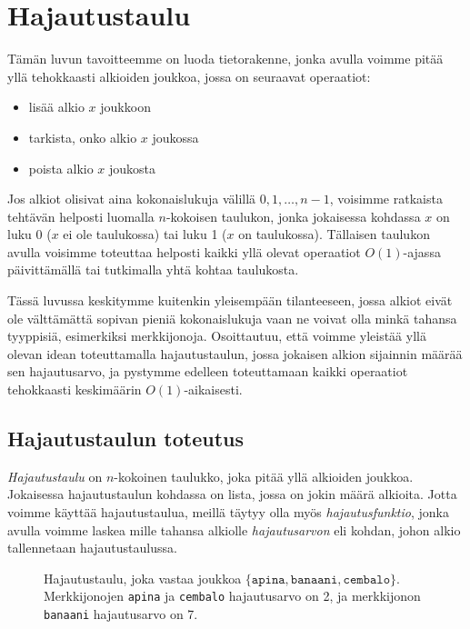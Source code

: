\chapter{Hajautustaulu}

Tämän luvun tavoitteemme on luoda tietorakenne,
jonka avulla voimme pitää yllä tehokkaasti alkioiden joukkoa,
jossa on seuraavat operaatiot:

\begin{itemize}
\item lisää alkio $x$ joukkoon
\item tarkista, onko alkio $x$ joukossa
\item poista alkio $x$ joukosta
\end{itemize}

Jos alkiot olisivat aina kokonaislukuja
välillä $0,1,\ldots,n-1$, voisimme ratkaista tehtävän
helposti luomalla $n$-kokoisen taulukon, jonka
jokaisessa kohdassa $x$ on luku 0 ($x$ ei ole taulukossa)
tai luku 1 ($x$ on taulukossa).
Tällaisen taulukon avulla voisimme toteuttaa
helposti kaikki yllä olevat operaatiot $O(1)$-ajassa
päivittämällä tai tutkimalla yhtä kohtaa taulukosta.

Tässä luvussa keskitymme kuitenkin yleisempään tilanteeseen,
jossa alkiot eivät ole välttämättä sopivan pieniä kokonaislukuja
vaan ne voivat olla minkä tahansa tyyppisiä, esimerkiksi merkkijonoja.
Osoittautuu, että voimme yleistää yllä olevan idean toteuttamalla
hajautustaulun, jossa jokaisen alkion sijainnin määrää sen hajautusarvo,
ja pystymme edelleen toteuttamaan kaikki operaatiot
tehokkaasti keskimäärin $O(1)$-aikaisesti.

\section{Hajautustaulun toteutus}

\emph{Hajautustaulu} on $n$-kokoinen taulukko,
joka pitää yllä alkioiden joukkoa.
Jokaisessa hajautustaulun kohdassa on lista,
jossa on jokin määrä alkioita.
Jotta voimme käyttää hajautustaulua,
meillä täytyy olla myös \emph{hajautusfunktio},
jonka avulla voimme laskea mille tahansa alkiolle
\emph{hajautusarvon} eli kohdan, johon alkio
tallennetaan hajautustaulussa.

\begin{figure}
\caption{Hajautustaulu, joka vastaa joukkoa $\{\texttt{apina},\texttt{banaani},\texttt{cembalo}\}$.
Merkkijonojen \texttt{apina} ja \texttt{cembalo} hajautusarvo on 2, ja merkkijonon
\texttt{banaani} hajautusarvo on 7.}
\label{fig:hajtau}
\end{figure}

